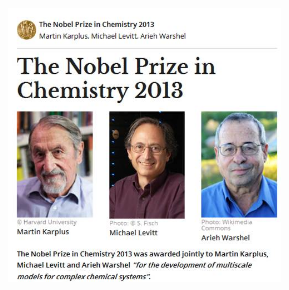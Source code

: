 \frame
{
	\frametitle{}
\begin{figure}[h!]
\centering
\vspace{-7.0pt}
\includegraphics[height=2.85in,width=3.80in,viewport=0 0 410 300,clip]{Figures/Nobel_Prize_Chemistry-2013.jpg}
\label{Nobel-Prize-Chemistry_2013}
\end{figure}
}

